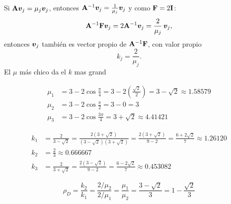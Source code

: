 

Si $\mathbf{A}\bm{v}_j = \mu_j\bm{v}_j$, entonces $\mathbf{A}^{-1}\bm{v}_j = \frac{1}{\mu_j}\bm{v}_j$ y como
$\mathbf{F} = 2\mathbf{I}$:
\[
\mathbf{A}^{-1}\mathbf{F}\bm{v}_j = 2\mathbf{A}^{-1}\bm{v}_j = \frac{2}{\mu_j}\,\bm{v}_j ,
\]
entonces $\bm{v}_j$ también es vector propio de $\mathbf{A}^{-1}\mathbf{F}$, con valor propio
\[
k_j = \frac{2}{\mu_j} .
\]
El $\mu$ más chico da el $k$ mas grand

\begin{align*}
	\mu_1 &= 3 - 2\cos\tfrac{\pi}{4} = 3 - 2\left(\tfrac{\sqrt2}{2}\right) = 3 - \sqrt2 \approx 1.58579\\
	\mu_2 &= 3 - 2\cos\tfrac{\pi}{2} = 3 - 0 = 3\\
	\mu_3 &= 3 - 2\cos\tfrac{3\pi}{4} = 3 + \sqrt2 \approx 4.41421
\end{align*}

\begin{align*}
	k_1 &= \frac{2}{3 - \sqrt2} = \frac{2(3 + \sqrt2)}{(3 - \sqrt2)(3 + \sqrt2)} = \frac{2(3 + \sqrt2)}{9 - 2}
	= \frac{6 + 2\sqrt2}{7} \approx 1.26120\\
	k_2 &= \frac{2}{3} \approx 0.666667\\
	k_3 &= \frac{2}{3 + \sqrt2} = \frac{2(3 - \sqrt2)}{9 - 2} = \frac{6 - 2\sqrt2}{7} \approx 0.453082
\end{align*}

\[
\rho_D = \frac{k_2}{k_1} = \frac{2/\mu_2}{2/\mu_1} = \frac{\mu_1}{\mu_2} = \frac{3 - \sqrt2}{3}
= 1 - \frac{\sqrt2}{3}
\]



